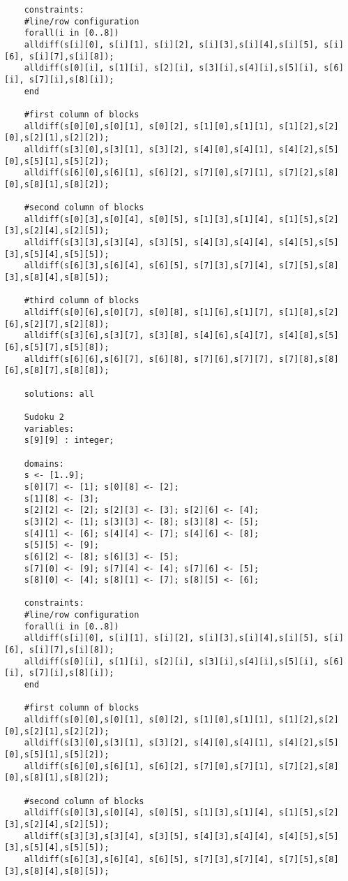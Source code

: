 \documentclass{article}
\begin{document}
\begin{itemize}
\begin{lstlisting}
	constraints:
	#line/row configuration
	forall(i in [0..8])
	alldiff(s[i][0], s[i][1], s[i][2], s[i][3],s[i][4],s[i][5], s[i][6], s[i][7],s[i][8]);
	alldiff(s[0][i], s[1][i], s[2][i], s[3][i],s[4][i],s[5][i], s[6][i], s[7][i],s[8][i]);
	end
	
	#first column of blocks
	alldiff(s[0][0],s[0][1], s[0][2], s[1][0],s[1][1], s[1][2],s[2][0],s[2][1],s[2][2]);
	alldiff(s[3][0],s[3][1], s[3][2], s[4][0],s[4][1], s[4][2],s[5][0],s[5][1],s[5][2]);
	alldiff(s[6][0],s[6][1], s[6][2], s[7][0],s[7][1], s[7][2],s[8][0],s[8][1],s[8][2]);
	
	#second column of blocks
	alldiff(s[0][3],s[0][4], s[0][5], s[1][3],s[1][4], s[1][5],s[2][3],s[2][4],s[2][5]);
	alldiff(s[3][3],s[3][4], s[3][5], s[4][3],s[4][4], s[4][5],s[5][3],s[5][4],s[5][5]);
	alldiff(s[6][3],s[6][4], s[6][5], s[7][3],s[7][4], s[7][5],s[8][3],s[8][4],s[8][5]);
	
	#third column of blocks
	alldiff(s[0][6],s[0][7], s[0][8], s[1][6],s[1][7], s[1][8],s[2][6],s[2][7],s[2][8]);
	alldiff(s[3][6],s[3][7], s[3][8], s[4][6],s[4][7], s[4][8],s[5][6],s[5][7],s[5][8]);
	alldiff(s[6][6],s[6][7], s[6][8], s[7][6],s[7][7], s[7][8],s[8][6],s[8][7],s[8][8]);
	
	solutions: all
	
	Sudoku 2
	variables:
	s[9][9] : integer;
	
	domains:
	s <- [1..9];
	s[0][7] <- [1]; s[0][8] <- [2]; 
	s[1][8] <- [3];
	s[2][2] <- [2]; s[2][3] <- [3]; s[2][6] <- [4];
	s[3][2] <- [1]; s[3][3] <- [8]; s[3][8] <- [5];
	s[4][1] <- [6]; s[4][4] <- [7]; s[4][6] <- [8];
	s[5][5] <- [9];
	s[6][2] <- [8]; s[6][3] <- [5];
	s[7][0] <- [9]; s[7][4] <- [4]; s[7][6] <- [5];
	s[8][0] <- [4]; s[8][1] <- [7]; s[8][5] <- [6];
	
	constraints:
	#line/row configuration
	forall(i in [0..8])
	alldiff(s[i][0], s[i][1], s[i][2], s[i][3],s[i][4],s[i][5], s[i][6], s[i][7],s[i][8]);
	alldiff(s[0][i], s[1][i], s[2][i], s[3][i],s[4][i],s[5][i], s[6][i], s[7][i],s[8][i]);
	end
	
	#first column of blocks
	alldiff(s[0][0],s[0][1], s[0][2], s[1][0],s[1][1], s[1][2],s[2][0],s[2][1],s[2][2]);
	alldiff(s[3][0],s[3][1], s[3][2], s[4][0],s[4][1], s[4][2],s[5][0],s[5][1],s[5][2]);
	alldiff(s[6][0],s[6][1], s[6][2], s[7][0],s[7][1], s[7][2],s[8][0],s[8][1],s[8][2]);
	
	#second column of blocks
	alldiff(s[0][3],s[0][4], s[0][5], s[1][3],s[1][4], s[1][5],s[2][3],s[2][4],s[2][5]);
	alldiff(s[3][3],s[3][4], s[3][5], s[4][3],s[4][4], s[4][5],s[5][3],s[5][4],s[5][5]);
	alldiff(s[6][3],s[6][4], s[6][5], s[7][3],s[7][4], s[7][5],s[8][3],s[8][4],s[8][5]);
	

\end{lstlisting}
\end{itemize}
\end{document}
